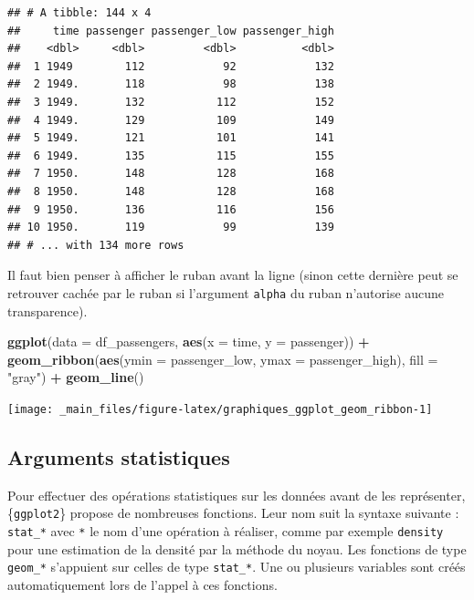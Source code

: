 \documentclass[
  11pt,
]{book}
\newenvironment{Shaded}{\begin{snugshade}}{\end{snugshade}}
\newcommand{\DataTypeTok}[1]{\textcolor[rgb]{0.13,0.29,0.53}{#1}}
\newcommand{\KeywordTok}[1]{\textcolor[rgb]{0.13,0.29,0.53}{\textbf{#1}}}
\newcommand{\NormalTok}[1]{#1}
\newcommand{\OperatorTok}[1]{\textcolor[rgb]{0.81,0.36,0.00}{\textbf{#1}}}
\newcommand{\StringTok}[1]{\textcolor[rgb]{0.31,0.60,0.02}{#1}}
\numberwithin{equation}{section}
\numberwithin{countremarque}{section}
\begin{document}
\begin{lstlisting}
## # A tibble: 144 x 4
##     time passenger passenger_low passenger_high
##    <dbl>     <dbl>         <dbl>          <dbl>
##  1 1949        112            92            132
##  2 1949.       118            98            138
##  3 1949.       132           112            152
##  4 1949.       129           109            149
##  5 1949.       121           101            141
##  6 1949.       135           115            155
##  7 1950.       148           128            168
##  8 1950.       148           128            168
##  9 1950.       136           116            156
## 10 1950.       119            99            139
## # ... with 134 more rows
\end{lstlisting}

Il faut bien penser à afficher le ruban avant la ligne (sinon cette dernière peut se retrouver cachée par le ruban si l'argument \texttt{alpha} du ruban n'autorise aucune transparence).

\begin{Shaded}
\begin{Highlighting}[]
\KeywordTok{ggplot}\NormalTok{(}\DataTypeTok{data =}\NormalTok{ df\_passengers,}
       \KeywordTok{aes}\NormalTok{(}\DataTypeTok{x =}\NormalTok{ time, }\DataTypeTok{y =}\NormalTok{ passenger)) }\OperatorTok{+}
\StringTok{  }\KeywordTok{geom\_ribbon}\NormalTok{(}\KeywordTok{aes}\NormalTok{(}\DataTypeTok{ymin =}\NormalTok{ passenger\_low, }\DataTypeTok{ymax =}\NormalTok{ passenger\_high),}
              \DataTypeTok{fill =} \StringTok{"gray"}\NormalTok{) }\OperatorTok{+}
\StringTok{  }\KeywordTok{geom\_line}\NormalTok{()}
\end{Highlighting}
\end{Shaded}

\begin{center}\texttt{[image: \_main\_files/figure-latex/graphiques\_ggplot\_geom\_ribbon-1]} \end{center}

\hypertarget{graphiques_ggplot_stat}{%
\subsection{Arguments statistiques}\label{graphiques_ggplot_stat}}

Pour effectuer des opérations statistiques sur les données avant de les représenter, \{\texttt{ggplot2}\} propose de nombreuses fonctions. Leur nom suit la syntaxe suivante : \texttt{stat\_*} avec \texttt{*} le nom d'une opération à réaliser, comme par exemple \texttt{density} pour une estimation de la densité par la méthode du noyau. Les fonctions de type \texttt{geom\_*} s'appuient sur celles de type \texttt{stat\_*}. Une ou plusieurs variables sont créés automatiquement lors de l'appel à ces fonctions.
\end{document}
